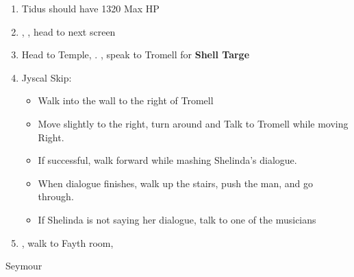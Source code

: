 \begin{enumerate}[resume]
	\item Tidus should have 1320 Max HP
	\item \sd, \cs[0:40], head to next screen
	\item Head to Temple, \sd. \save, speak to Tromell for \textbf{Shell Targe}
	\wincb
	\item Jyscal Skip:
	      \begin{itemize}
		      \item Walk into the wall to the right of Tromell
		      \item Move slightly to the right, turn around and Talk to Tromell while moving Right.
		      \item If successful, walk forward while mashing Shelinda's dialogue.
		      \item When dialogue finishes, walk up the stairs, push the man, and go through.
		      \item If Shelinda is not saying her dialogue, talk to one of the musicians
	      \end{itemize}
	\item \sd, walk to Fayth room, \cs[2:10]
\end{enumerate}
\bothvfill
\begin{battle}[3000]{Seymour}
	\begin{itemize}
	\end{itemize}
\end{battle}
\bothvfill
\lossvfill
